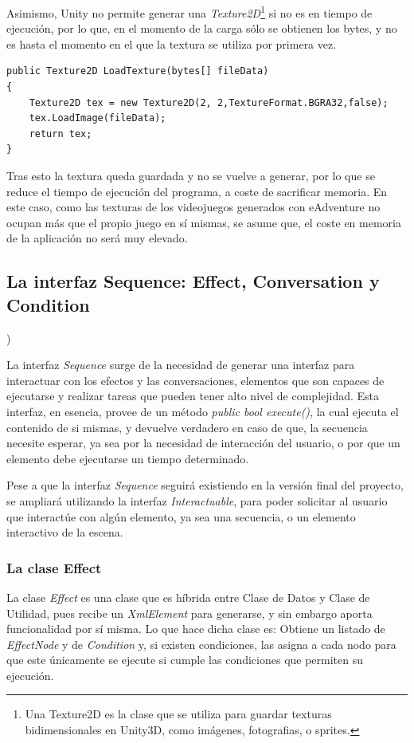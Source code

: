 Asimismo, Unity no permite generar una \textit{Texture2D}\footnote{Una Texture2D es la clase que se utiliza para guardar texturas bidimensionales en Unity3D, como imágenes, fotografias, o sprites.} si no es en tiempo de ejecución, por lo que, en el momento de la carga sólo se obtienen los bytes, y no es hasta el momento en el que la textura se utiliza por primera vez.

\begin{lstlisting}
public Texture2D LoadTexture(bytes[] fileData)
{
	Texture2D tex = new Texture2D(2, 2,TextureFormat.BGRA32,false);
	tex.LoadImage(fileData);
	return tex;
}
\end{lstlisting}

Tras esto la textura queda guardada y no se vuelve a generar, por lo que se reduce el tiempo de ejecución del programa, a coste de sacrificar memoria. En este caso, como las texturas de los videojuegos generados con eAdventure no ocupan más que el propio juego en sí mismas, se asume que, el coste en memoria de la aplicación no será muy elevado.

\subsection{La interfaz Sequence: Effect, Conversation y Condition})
\label{sequencessecit2}

La interfaz \textit{Sequence} surge de la necesidad de generar una interfaz para interactuar con los efectos y las conversaciones, elementos que son capaces de ejecutarse y realizar tareas que pueden tener alto nivel de complejidad. Esta interfaz, en esencia, provee de un método \textit{public bool execute()}, la cual ejecuta el contenido de si mismas, y devuelve verdadero en caso de que, la secuencia necesite esperar, ya sea por la necesidad de interacción del usuario, o por que un elemento debe ejecutarse un tiempo determinado.

Pese a que la interfaz \textit{Sequence} seguirá existiendo en la versión final del proyecto, se ampliará utilizando la interfaz \textit{Interactuable}, para poder solicitar al usuario que interactúe con algún elemento, ya sea una secuencia, o un elemento interactivo de la escena.

\subsubsection{La clase Effect}

La clase \textit{Effect} es una clase que es híbrida entre Clase de Datos y Clase de Utilidad, pues recibe un \textit{XmlElement} para generarse, y sin embargo aporta funcionalidad por sí misma. Lo que hace dicha clase es: Obtiene un listado de \textit{EffectNode} y de \textit{Condition} y, si existen condiciones, las asigna a cada nodo para que este únicamente se ejecute si cumple las condiciones que permiten su ejecución.

